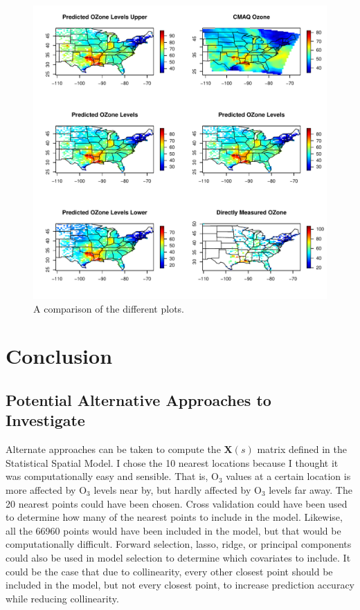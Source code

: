 \documentclass{article}                                                   %
\def\beginmyfig{\begin{figure}[htbp]\begin{center}}                       %
\def\endmyfig{\end{center}\end{figure}}                                   %
\begin{document}
    \beginmyfig  
      \includegraphics{raw/all.pdf}
      \caption{A comparison of the different plots.}
    \endmyfig

\section{Conclusion}
  \subsection{Potential Alternative Approaches to Investigate}
    Alternate approaches can be taken to compute the $\bm X(s)$ matrix defined
    in the Statistical Spatial Model. I chose the 10 nearest locations because
    I thought it was computationally easy and sensible. That is, O$_3$ values
    at a certain location is more affected by O$_3$ levels near by, but hardly
    affected by O$_3$ levels far away. The 20 nearest points could have been 
    chosen. Cross validation could have been used to determine how many of 
    the nearest points to include in the model. Likewise, all the 66960 
    points would have been included in the model, but that would be computationally
    difficult. Forward selection, lasso, ridge, or principal components
    could also be used in model selection to determine which covariates to include.
    It could be the case that due to collinearity, every other closest
    point should be included in the model, but not every closest point, to 
    increase prediction accuracy while reducing collinearity.
\end{document}
